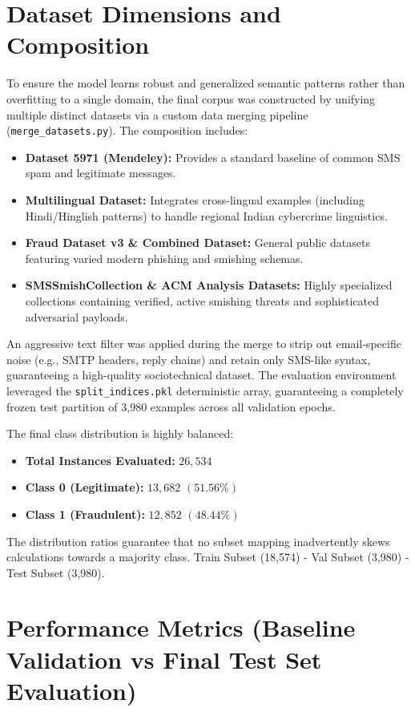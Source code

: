 \section{Dataset Dimensions and Composition}
To ensure the model learns robust and generalized semantic patterns rather than overfitting to a single domain, the final corpus was constructed by unifying multiple distinct datasets via a custom data merging pipeline (\texttt{merge\_datasets.py}). The composition includes:
\begin{itemize}
    \item \textbf{Dataset 5971 (Mendeley):} Provides a standard baseline of common SMS spam and legitimate messages.
    \item \textbf{Multilingual Dataset:} Integrates cross-lingual examples (including Hindi/Hinglish patterns) to handle regional Indian cybercrime linguistics.
    \item \textbf{Fraud Dataset v3 \& Combined Dataset:} General public datasets featuring varied modern phishing and smishing schemas.
    \item \textbf{SMSSmishCollection \& ACM Analysis Datasets:} Highly specialized collections containing verified, active smishing threats and sophisticated adversarial payloads.
\end{itemize}

An aggressive text filter was applied during the merge to strip out email-specific noise (e.g., SMTP headers, reply chains) and retain only SMS-like syntax, guaranteeing a high-quality sociotechnical dataset. The evaluation environment leveraged the \texttt{split\_indices.pkl} deterministic array, guaranteeing a completely frozen test partition of 3,980 examples across all validation epochs. 

The final class distribution is highly balanced:
\begin{itemize}
    \item \textbf{Total Instances Evaluated:} $26,534$
    \item \textbf{Class 0 (Legitimate):} $13,682 \,\, (51.56\%)$
    \item \textbf{Class 1 (Fraudulent):} $12,852 \,\, (48.44\%)$
\end{itemize}
The distribution ratios guarantee that no subset mapping inadvertently skews calculations towards a majority class.
Train Subset (18,574) - Val Subset (3,980) - Test Subset (3,980).

\section{Performance Metrics (Baseline Validation vs Final Test Set Evaluation)}

